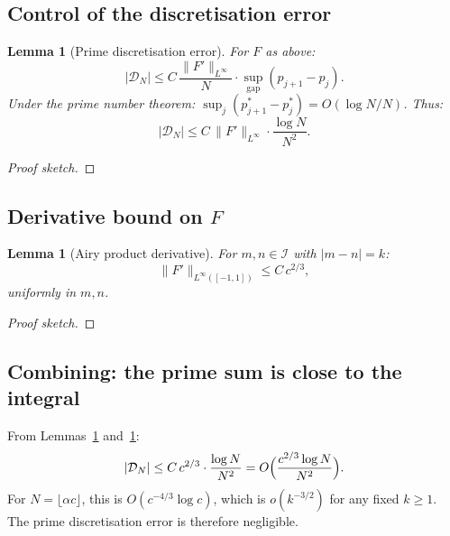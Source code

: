 \documentclass[12pt,a4paper]{amsart}
\newtheorem{lemma}[theorem]{Lemma}
\theoremstyle{definition}
\newcommand{\norm}[1]{\|#1\|}
\begin{document}
\subsection{Control of the discretisation error}

\begin{lemma}[Prime discretisation error]\label{lem:primeerr}
For $F$ as above:
\[
  |\mathcal{D}_N|
  \le C\, \frac{\norm{F'}_{L^\infty}}{N}\cdot \sup_{\text{gap}} (p_{j+1} - p_j).
\]
Under the prime number theorem: $\sup_j(p_{j+1}^* - p_j^*) = O(\log N / N)$.
Thus:
\[
  |\mathcal{D}_N| \le C\, \norm{F'}_{L^\infty} \cdot \frac{\log N}{N^2}.
\]
\end{lemma}

\begin{proof}[Proof sketch]
\end{proof}

\subsection{Derivative bound on $F$}

\begin{lemma}[Airy product derivative]\label{lem:Fprime}
For $m, n \in \mathcal{I}$ with $|m-n| = k$:
\[
  \norm{F'}_{L^\infty([-1,1])} \le C\, c^{2/3},
\]
uniformly in $m, n$.
\end{lemma}

\begin{proof}[Proof sketch]
\end{proof}

\subsection{Combining: the prime sum is close to the integral}

From Lemmas~\ref{lem:primeerr} and~\ref{lem:Fprime}:
\[
  |\mathcal{D}_N| \le C\, c^{2/3} \cdot \frac{\log N}{N^2}
  = O\Bigl(\frac{c^{2/3} \log N}{N^2}\Bigr).
\]
For $N = \lfloor \alpha c \rfloor$, this is $O(c^{-4/3} \log c)$,
which is $o(k^{-3/2})$ for any fixed $k \ge 1$.
The prime discretisation error is therefore negligible.
\end{document}
